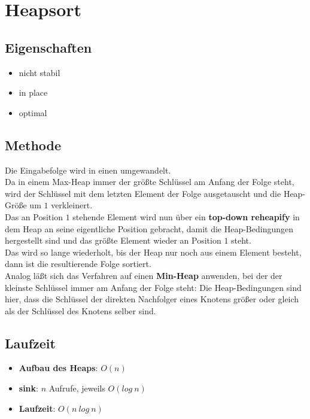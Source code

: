 \section{Heapsort}

\subsection{Eigenschaften}
\begin{itemize}
    \item nicht stabil
    \item in place
    \item optimal
\end{itemize}

\subsection{Methode}
Die Eingabefolge wird in einen  umgewandelt.\\
Da in einem Max-Heap immer der größte Schlüssel am Anfang der Folge steht, wird der Schlüssel mit dem letzten Element der Folge ausgetauscht und die Heap-Größe um $1$ verkleinert.\\
Das an Position $1$ stehende Element wird nun über ein \textbf{top-down reheapify} in dem Heap an seine eigentliche Position gebracht, damit die Heap-Bedingungen hergestellt sind und das größte Element wieder an Position $1$ steht.\\
Das wird so lange wiederholt, bis der Heap nur noch aus einem Element besteht, dann ist die resultierende Folge sortiert.\\

\noindent
Analog läßt sich das Verfahren auf einen \textbf{Min-Heap} anwenden, bei der der kleinste Schlüssel immer am Anfang der Folge steht: Die Heap-Bedingungen sind hier, dass die Schlüssel der direkten Nachfolger eines Knotens größer oder gleich als der Schlüssel des Knotens selber sind.



\subsection{Laufzeit}
\begin{itemize}
    \item \textbf{Aufbau des Heaps}: $O(n)$
    \item \textbf{sink}: $n$ Aufrufe, jeweils $O(log\ n)$
    \item \textbf{Laufzeit}: $O(n\ log\ n)$
\end{itemize}